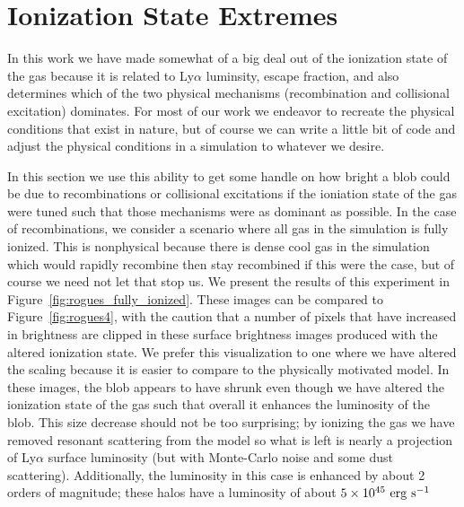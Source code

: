 \section{Ionization State Extremes}
\label{sec:ionization_extremes}
In this work we have made somewhat of a big deal out of the ionization state of the gas because it is related to Ly$\alpha$ luminsity, escape fraction, and also determines which of the two physical mechanisms (recombination and collisional excitation) dominates.
For most of our work we endeavor to recreate the physical conditions that exist in nature, but of course we can write a little bit of code and adjust the physical conditions in a simulation to whatever we desire.

In this section we use this ability to get some handle on how bright a blob could be due to recombinations or collisional excitations if the ioniation state of the gas were tuned such that those mechanisms were as dominant as possible.
In the case of recombinations, we consider a scenario where all gas in the simulation is fully ionized.
This is nonphysical because there is dense cool gas in the simulation which would rapidly recombine then stay recombined if this were the case, but of course we need not let that stop us.
We present the results of this experiment in Figure~\ref{fig:rogues_fully_ionized}.
These images can be compared to Figure~\ref{fig:rogues4}, with the caution that a number of pixels that have increased in brightness are clipped in these surface brightness images produced with the altered ionization state.
We prefer this visualization to one where we have altered the scaling because it is easier to compare to the physically motivated model.
In these images, the blob appears to have shrunk even though we have altered the ionization state of the gas such that overall it enhances the luminosity of the blob.
This size decrease should not be too surprising; by ionizing the gas we have removed resonant scattering from the model so what is left is nearly a projection of Ly$\alpha$ surface luminosity (but with Monte-Carlo noise and some dust scattering).
Additionally, the luminosity in this case is enhanced by about 2 orders of magnitude; these halos have a luminosity of about $5\times10^{45}\ \rm{erg}\ \rm{s}^{-1}$

